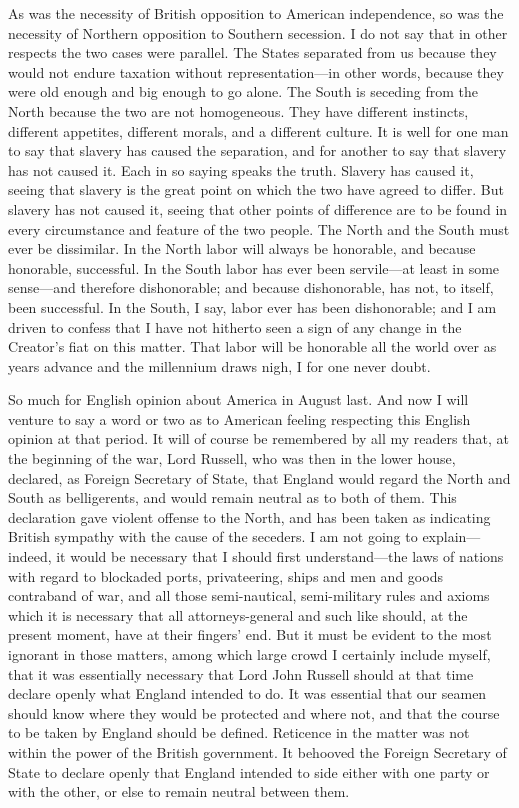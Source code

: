 As was the necessity of British opposition to American
independence, so was the necessity of Northern opposition to
Southern secession.  I do not say that in other respects the two
cases were parallel.  The States separated from us because they
would not endure taxation without representation---in other words,
because they were old enough and big enough to go alone.  The South
is seceding from the North because the two are not homogeneous.
They have different instincts, different appetites, different
morals, and a different culture.  It is well for one man to say
that slavery has caused the separation, and for another to say that
slavery has not caused it.  Each in so saying speaks the truth.
Slavery has caused it, seeing that slavery is the great point on
which the two have agreed to differ.  But slavery has not caused
it, seeing that other points of difference are to be found in every
circumstance and feature of the two people.  The North and the
South must ever be dissimilar.  In the North labor will always be
honorable, and because honorable, successful.  In the South labor
has ever been servile---at least in some sense---and therefore
dishonorable; and because dishonorable, has not, to itself, been
successful.  In the South, I say, labor ever has been dishonorable;
and I am driven to confess that I have not hitherto seen a sign of
any change in the Creator's fiat on this matter.  That labor will
be honorable all the world over as years advance and the millennium
draws nigh, I for one never doubt.

So much for English opinion about America in August last.  And now
I will venture to say a word or two as to American feeling
respecting this English opinion at that period.  It will of course
be remembered by all my readers that, at the beginning of the war,
Lord Russell, who was then in the lower house, declared, as Foreign
Secretary of State, that England would regard the North and South
as belligerents, and would remain neutral as to both of them.  This
declaration gave violent offense to the North, and has been taken
as indicating British sympathy with the cause of the seceders.  I
am not going to explain---indeed, it would be necessary that I
should first understand---the laws of nations with regard to
blockaded ports, privateering, ships and men and goods contraband
of war, and all those semi-nautical, semi-military rules and axioms
which it is necessary that all attorneys-general and such like
should, at the present moment, have at their fingers' end.  But it
must be evident to the most ignorant in those matters, among which
large crowd I certainly include myself, that it was essentially
necessary that Lord John Russell should at that time declare openly
what England intended to do.  It was essential that our seamen
should know where they would be protected and where not, and that
the course to be taken by England should be defined.  Reticence in
the matter was not within the power of the British government.  It
behooved the Foreign Secretary of State to declare openly that
England intended to side either with one party or with the other,
or else to remain neutral between them.

